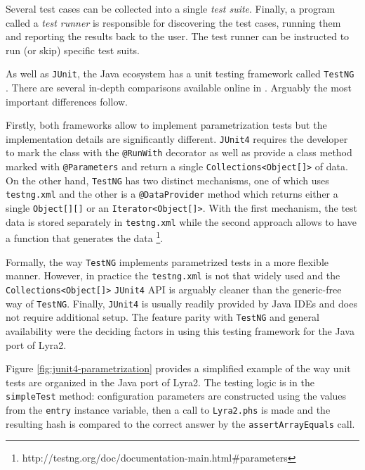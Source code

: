 Several test cases can be collected into a single \emph{test suite}. Finally, a program called a \emph{test runner} is responsible for discovering the test cases, running them and reporting the results back to the user. The test runner can be instructed to run (or skip) specific test suits.

As well as \texttt{JUnit}, the Java ecosystem has a unit testing framework called \texttt{TestNG} \cite{testng:2017:home}. There are several in-depth comparisons available online in \cite{mkyong:2017:testng-vs-junit, wiki:2017:testng-vs-junit}. Arguably the most important differences follow.

Firstly, both frameworks allow to implement parametrization tests but the implementation details are significantly different.  \texttt{JUnit4} requires the developer to mark the class with the \texttt{@RunWith} decorator as well as provide a class method marked with \texttt{@Parameters} and return a single \texttt{Collections<Object[]>} of data. On the other hand, \texttt{TestNG} has two distinct mechanisms, one of which uses \texttt{testng.xml} and the other is a \texttt{@DataProvider} method which returns either a single \texttt{Object[][]} or an \texttt{Iterator<Object[]>}. With the first mechanism, the test data is stored separately in \texttt{testng.xml} while the second approach allows to have a function that generates the data \footnote{http://testng.org/doc/documentation-main.html\#parameters}.

Formally, the way \texttt{TestNG} implements parametrized tests in a more flexible manner. However, in practice the \texttt{testng.xml} is not that widely used and the \texttt{Collections<Object[]>} \texttt{JUnit4} API is arguably cleaner than the generic-free way of \texttt{TestNG}. Finally, \texttt{JUnit4} is usually readily provided by Java IDEs and does not require additional setup. The feature parity with \texttt{TestNG} and general availability were the deciding factors in using this testing framework for the Java port of Lyra2.

Figure \ref{fig:junit4-parametrization} provides a simplified example of the way unit tests are organized in the Java port of Lyra2. The testing logic is in the \texttt{simpleTest} method: configuration parameters are constructed using the values from the \texttt{entry} instance variable, then a call to \texttt{Lyra2.phs} is made and the resulting hash is compared to the correct answer by the \texttt{assertArrayEquals} call.

